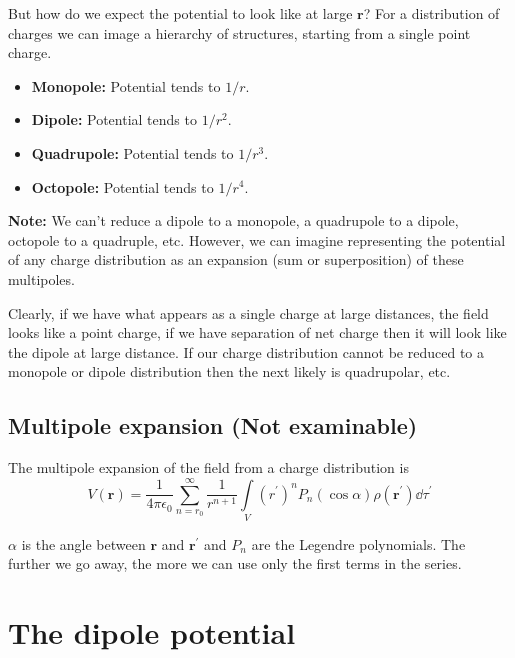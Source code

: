 \documentclass[12pt,chapterprefix=false,dvipsnames]{scrbook}
\theoremstyle{dotless}
\theoremstyle{definition}
\begin{document}
But how do we expect the potential to look like at large
$\bm{r}$? For a distribution of charges we can
image a hierarchy of structures, starting from a single point
charge.

\begin{itemize}
	\item \textbf{Monopole:}  Potential tends to
	      $1/r$.
	\item \textbf{Dipole:}  Potential tends to
	      $1/{r}^2$.
	\item \textbf{Quadrupole:}  Potential tends to
	      $1/{r}^3$.
	\item \textbf{Octopole:}  Potential tends to
	      $1/{r}^4$.
\end{itemize}

\textbf{Note:} We can't reduce a dipole to a monopole,
a quadrupole to a dipole, octopole to a quadruple, etc. However,
we can imagine representing the potential of any charge
distribution as an expansion (sum or superposition) of these
multipoles.

Clearly, if we have what appears as a single charge at large
distances, the field looks like a point charge, if we have
separation of net charge then it will look like the dipole at
large distance. If our charge distribution cannot be reduced to
a monopole or dipole distribution then the next likely is
quadrupolar, etc.

\subsection{Multipole expansion (Not examinable)}%
\label{sub:multipole_expansion_not_examinable_}

The multipole expansion of the field from a charge distribution
is
\begin{equation}
	V\left(\bm{r}\right) =
	\frac{1}{4\pi\epsilon_{0}}\sum_{n=r_0}^{\infty}\frac{1}{r^{n+1}}\int\limits_{V}{\left(r^\prime\right)}^n
	P_n\left(\cos{\alpha}\right)\rho\left(\bm{r}^\prime\right)
	\dd{\tau^\prime}
\end{equation}

$\alpha$ is the angle between
$\bm{r}$ and $\bm{r}^\prime$ and
$P_n$ are the Legendre polynomials. The
further we go away, the more we can use only the first terms in
the series.

\section{The dipole potential}%
\label{sec:the_dipole_potential}
\end{document}
